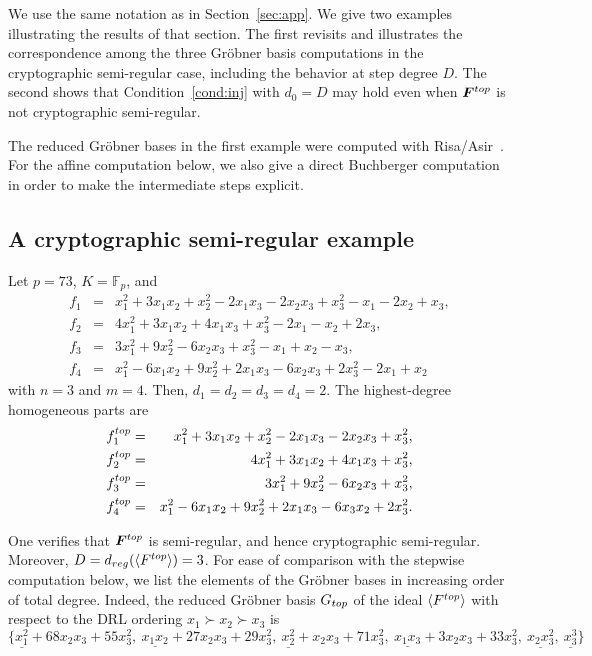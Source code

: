 \documentclass{article}
\theoremstyle{definition}
\theoremstyle{plain}
\theoremstyle{plain}
\theoremstyle{plain}
\theoremstyle{plain}
\numberwithin{equation}{subsection}
\begin{document}
\def\thesection{\Alph{section}}\label{app:A}

We use the same notation as in Section~\ref{sec:app}.
We give two examples illustrating the results of that section.
The first revisits \cite[Example~1]{KY} and illustrates the correspondence among the three Gr\"obner basis computations in the cryptographic semi-regular case, including the behavior at step degree $D$.
The second shows that Condition~\ref{cond:inj} with $d_0=D$ may hold even when $\bm F^{\rm top}$ is not cryptographic semi-regular.

The reduced Gr\"obner bases in the first example were computed with Risa/Asir~\cite{Asir}.
For the affine computation below, we also give a direct Buchberger computation in order to make the intermediate steps explicit.

\subsection{A cryptographic semi-regular example}\label{app:example-csr}

Let $p=73$, $K={\mathbb F}_p$, and
\begin{eqnarray*}
f_1 & = & x_1^2+3x_1 x_2+x_2^2-2x_1x_3-2x_2x_3+x_3^2-x_1-2x_2+x_3,\\
f_2 & = & 4x_1^2+3x_1x_2+4x_1x_3+x_3^2-2x_1-x_2+2x_3,\\
f_3 & = & 3x_1^2+9x_2^2-6x_2x_3+x_3^2-x_1+x_2-x_3,\\
f_4 & = & x_1^2-6x_1x_2+9x_2^2+2x_1x_3-6x_2x_3+2x_3^2-2x_1+x_2
\end{eqnarray*}
with $n=3$ and $m=4$.
Then, $d_1=d_2=d_3=d_4=2$.
The highest-degree homogeneous parts are
{\small 
\begin{eqnarray*}
f_1^{\rm top} & = & x_1^2+3x_1x_2+x_2^2-2x_1x_3-2x_2x_3+x_3^2,\\
f_2^{\rm top} & = & 4x_1^2+3x_1x_2+4x_1x_3+x_3^2,\\
f_3^{\rm top} & = & 3x_1^2+9x_2^2-6x_2x_3+x_3^2,\\
f_4^{\rm top} & = & x_1^2-6x_1x_2+9x_2^2+2x_1x_3-6x_3x_2+2x_3^2.
\end{eqnarray*}}

\noindent
One verifies that $\bm{F}^{\rm top}$ is semi-regular, and hence cryptographic semi-regular.
Moreover, $D=d_{\rm reg}(\langle F^{\rm top}\rangle) =3$.
For ease of comparison with the stepwise computation below, we list the elements of the Gr\"obner bases in increasing order of total degree.
Indeed, the reduced Gr\"obner basis $G_{\rm top}$ of the ideal $\langle F^{\rm top}\rangle$ with respect to the DRL ordering $x_1\succ x_2\succ x_3$ is 
{\small
\[
\{ \underline{x_1^2}+68x_2x_3+55x_3^2,\ 
\underline{x_1x_2}+27x_2x_3+29x_3^2,\ 
\underline{x_2^2}+x_2x_3+71x_3^2,\ 
\underline{x_1x_3}+3x_2x_3+33x_3^2,\ 
\underline{x_2x_3^2},\
\underline{x_3^3}
\}
\]}
\end{document}
